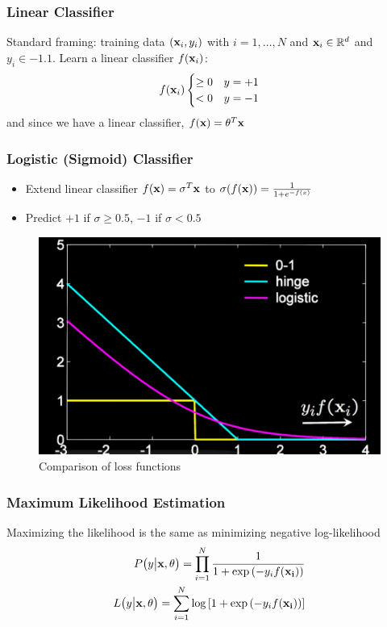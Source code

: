 \documentclass[10pt]{beamer}
\begin{document}
\begin{frame}
	\frametitle{Linear Classifier}
	Standard framing: training data $\qty(\vb{x}_i, y_i)$ with $i = 1, \ldots, N$ and $\vb{x}_i \in \mathbb{R}^d$ and $y_i \in \qty{-1, 1}$.
	Learn a linear classifier $f \qty( \vb{x}_i)$:
	\begin{equation}
		f \qty(\vb{x}_i) \begin{cases}\geq 0 & y = +1 \\ < 0 & y = -1\end{cases}
	\end{equation}
	and since we have a linear classifier, $f(\vb{x}) = \vb{\theta}^T \vb{x}$
\end{frame}

\begin{frame}
	\frametitle{Logistic (Sigmoid) Classifier}
	\begin{itemize}
		\item Extend linear classifier $f(\vb{x}) = \sigma^T \vb{x}$ to $\sigma \qty(f(\vb{x})) = \frac{1}{1 + e^{-f(x)}}$
		\item Predict $+1$ if $\sigma \geq 0.5$, $-1$ if $\sigma < 0.5$
	\end{itemize}
	\begin{figure}
		\includegraphics[width=\textwidth,height=0.45\textheight,keepaspectratio=true]{loss_fn.png}
		\caption{Comparison of loss functions}
		\label{fig:loss-function}
	\end{figure}
\end{frame}

\begin{frame}
	\frametitle{Maximum Likelihood Estimation}
	Maximizing the likelihood is the same as minimizing negative log-likelihood
	\begin{align}
		P \qty(y \big | \vb{x},\vb{\theta}) = \prod_{i=1}^N \frac{1}{1 + \exp \qty(-y_i f(\vb{x_i}))} \\
		L \qty(y \big | \vb{x},\vb{\theta}) = \sum_{i=1}^N \log \qty[1 + \exp \qty(-y_i f(\vb{x_i}))]
	\end{align}
\end{frame}
\end{document}
